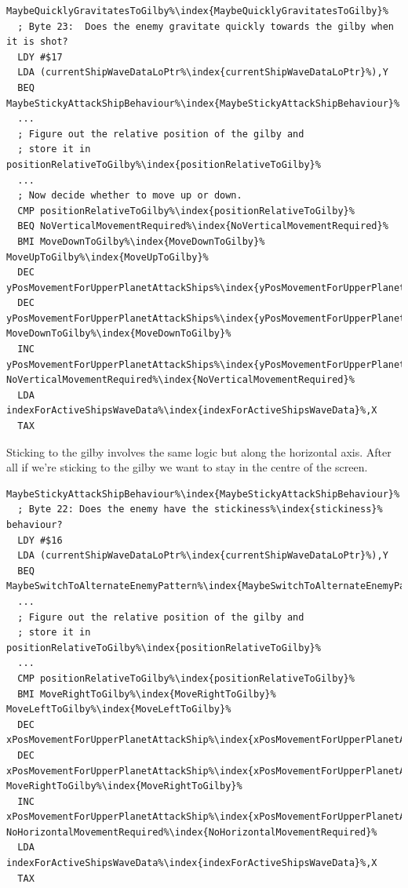 \begin{lstlisting}[escapechar=\%]
MaybeQuicklyGravitatesToGilby%\index{MaybeQuicklyGravitatesToGilby}%
  ; Byte 23:  Does the enemy gravitate quickly towards the gilby when it is shot?
  LDY #$17
  LDA (currentShipWaveDataLoPtr%\index{currentShipWaveDataLoPtr}%),Y
  BEQ MaybeStickyAttackShipBehaviour%\index{MaybeStickyAttackShipBehaviour}%
  ...
  ; Figure out the relative position of the gilby and
  ; store it in positionRelativeToGilby%\index{positionRelativeToGilby}%
  ...
  ; Now decide whether to move up or down.
  CMP positionRelativeToGilby%\index{positionRelativeToGilby}%
  BEQ NoVerticalMovementRequired%\index{NoVerticalMovementRequired}%
  BMI MoveDownToGilby%\index{MoveDownToGilby}%
MoveUpToGilby%\index{MoveUpToGilby}%
  DEC yPosMovementForUpperPlanetAttackShips%\index{yPosMovementForUpperPlanetAttackShips}%,X
  DEC yPosMovementForUpperPlanetAttackShips%\index{yPosMovementForUpperPlanetAttackShips}%,X
MoveDownToGilby%\index{MoveDownToGilby}%
  INC yPosMovementForUpperPlanetAttackShips%\index{yPosMovementForUpperPlanetAttackShips}%,X
NoVerticalMovementRequired%\index{NoVerticalMovementRequired}%
  LDA indexForActiveShipsWaveData%\index{indexForActiveShipsWaveData}%,X
  TAX
\end{lstlisting}

Sticking to the gilby involves the same logic but along the horizontal axis. After all if we're sticking to the gilby
we want to stay in the centre of the screen.

\begin{lstlisting}[escapechar=\%]
MaybeStickyAttackShipBehaviour%\index{MaybeStickyAttackShipBehaviour}%   
  ; Byte 22: Does the enemy have the stickiness%\index{stickiness}% behaviour?
  LDY #$16
  LDA (currentShipWaveDataLoPtr%\index{currentShipWaveDataLoPtr}%),Y
  BEQ MaybeSwitchToAlternateEnemyPattern%\index{MaybeSwitchToAlternateEnemyPattern}%
  ...
  ; Figure out the relative position of the gilby and
  ; store it in positionRelativeToGilby%\index{positionRelativeToGilby}%
  ...
  CMP positionRelativeToGilby%\index{positionRelativeToGilby}%
  BMI MoveRightToGilby%\index{MoveRightToGilby}%
MoveLeftToGilby%\index{MoveLeftToGilby}%   
  DEC xPosMovementForUpperPlanetAttackShip%\index{xPosMovementForUpperPlanetAttackShip}%,X
  DEC xPosMovementForUpperPlanetAttackShip%\index{xPosMovementForUpperPlanetAttackShip}%,X
MoveRightToGilby%\index{MoveRightToGilby}%   
  INC xPosMovementForUpperPlanetAttackShip%\index{xPosMovementForUpperPlanetAttackShip}%,X
NoHorizontalMovementRequired%\index{NoHorizontalMovementRequired}%   
  LDA indexForActiveShipsWaveData%\index{indexForActiveShipsWaveData}%,X
  TAX
\end{lstlisting}

